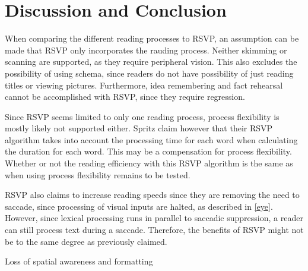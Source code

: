 \section{Discussion and Conclusion}
When comparing the different reading processes to RSVP, an assumption can be made that RSVP only incorporates the rauding process. Neither skimming or scanning are supported, as they require peripheral vision. This also excludes the possibility of using schema, since readers do not have possibility of just reading titles or viewing pictures. Furthermore, idea remembering and fact rehearsal cannot be accomplished with RSVP, since they require regression. 

Since RSVP seems limited to only one reading process, process flexibility is mostly likely not supported either. Spritz claim however that their RSVP algorithm takes into account the processing time for each word when calculating the duration for each word. This may be a compensation for process flexibility. Whether or not the reading efficiency with this RSVP algorithm is the same as when using process flexibility remains to be tested.

RSVP also claims to increase reading speeds since they are removing the need to saccade, since processing of visual inputs are halted, as described in \ref{eye}. However, since lexical processing runs in parallel 
to saccadic suppression, a reader can still process text during a saccade. Therefore, the benefits of RSVP might not be to the same degree as previously claimed.

Loss of spatial awareness and formatting